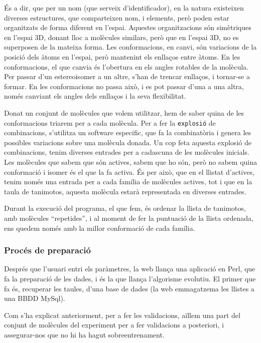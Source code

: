 És a dir, que per un nom (que serveix d'identificador), en la natura existeixen
diverses estructures, que comparteixen nom, i elements, però poden estar
organitzats de forma diferent en l'espai. Aquestes organitzacions són
simètriques en l'espai 3D, donant lloc a molècules similars, però que en l'espai
3D, no es superposen de la mateixa forma.  Les conformacions, en canvi, són
variacions de la posició dels àtoms en l'espai, però mantenint els enllaços
entre àtoms. En les conformacions, el que canvia és l'obertura en els angles
rotables de la molècula.  Per passar d'un estereoisomer a un altre, s'han de
trencar enllaços, i tornar-se a formar.  En les conformacions no passa això, i
es pot passar d'una a una altra, només canviant els angles dels enllaços i la
seva flexibilitat. 

Donat un conjunt de molècules que volem utilitzar, hem de saber quina de les
conformacions triarem per a cada molècula.  Per a fer la \texttt{explosió} de
combinacions, s'utilitza un software especific, que fa la combinatòria i genera
les possibles variacions sobre una molècula donada.  Un cop feta aquesta
explosió de combinacions, tenim diverses entrades per a cadascuna de les
molècules inicials.  Les molècules que sabem que són actives, sabem que ho són,
però no sabem quina conformació i isomer és el que la fa activa.  És per això,
que en el llistat d'actives, tenim només una entrada per a cada família de
molècules actives, tot i que en la taula de tanimotos, aquesta molècula estarà
representada en diverses entrades. 

Durant la execució del programa, el que fem, és ordenar la llista de tanimotos,
amb molècules ``repetides'', i al moment de fer la puntuació de la llista
ordenada, ens quedem només amb la millor conformació de cada família.

\subsubsection{Procés de preparació} %
\label{ssub:Proces de preparacio}

Després que l'usuari entri els paràmetres, la web llança una aplicació en Perl,
que fa la preparació de les dades, i és la que llança l'algorisme evolutiu.  El
primer que fa és, recuperar les taules, d'una base de dades (la web emmagatzema
les llistes a una BBDD MySql).

Com s'ha explicat anteriorment, per a fer les validacions, aïllem una part del
conjunt de molècules del experiment per a fer validacions a posteriori, i
assegurar-nos que no hi ha hagut sobreentrenament.

